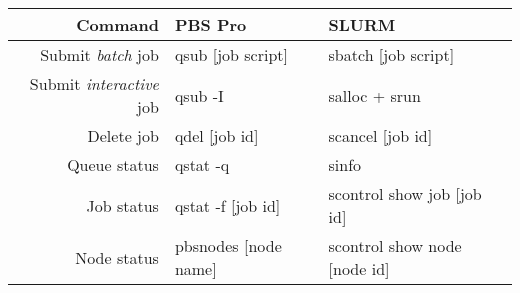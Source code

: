 \small
{\renewcommand{\arraystretch}{1.2}%
\begin{tabularx}{\textwidth}{r|X|X}
\toprule
{\bf Command} & {\bf PBS Pro} & {\bf SLURM}  \\
\midrule

Submit {\em batch} job &
qsub [job script] &
sbatch [job script]
\\ \hline

Submit {\em interactive} job &
qsub -I &
salloc + srun
\\ \hline

Delete job &
qdel [job id] &
scancel [job id]
\\ \hline

Queue status &
qstat -q &
sinfo
\\ \hline

Job status &
qstat -f [job id]  &
scontrol show job [job id]
\\ \hline

Node status &
pbsnodes [node name] &
scontrol show node [node id]
\\ \hline

\bottomrule
\end{tabularx}}



